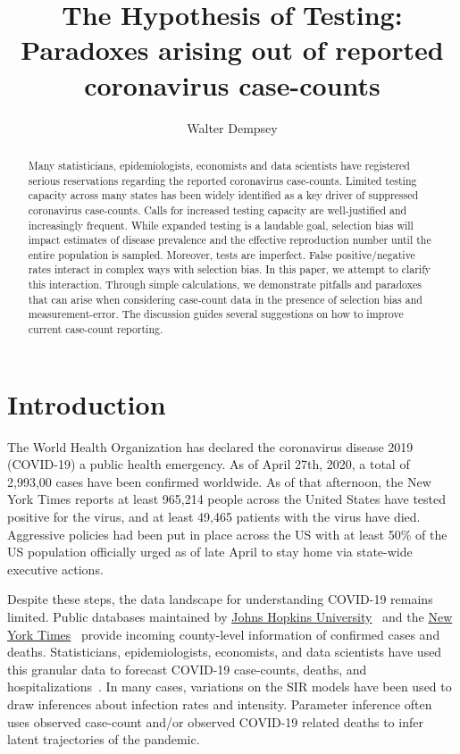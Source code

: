 \documentclass[aoas]{amsart}
\begin{document}
\title[The Hypothesis of Testing]{The Hypothesis of Testing: Paradoxes arising out of reported coronavirus case-counts} %

\author{Walter Dempsey}
\address{Department of Biostatistics, University of Michigan, Ann Arbor, MI 48109}

\begin{abstract}
Many statisticians, epidemiologists, economists and data scientists have registered serious reservations regarding the reported coronavirus case-counts. Limited testing capacity across many states has been widely identified as a key driver of suppressed coronavirus case-counts.  Calls for increased testing capacity are well-justified and increasingly frequent.  While expanded testing is a laudable goal, selection bias will impact estimates of disease prevalence and the effective reproduction number until the entire population is sampled.  Moreover, tests are imperfect.  False positive/negative rates interact in complex ways with selection bias.  In this paper, we attempt to clarify this interaction.  Through simple calculations, we demonstrate pitfalls and paradoxes that can arise when considering case-count data in the presence of selection bias and measurement-error. The discussion guides several suggestions on how to improve current case-count reporting.
\end{abstract}

\maketitle

\section{Introduction}
The World Health Organization has declared the coronavirus disease 2019 (COVID-19) a public health emergency.  As of April 27th, 2020, a total of 2,993,00 cases have been confirmed worldwide.  As of that afternoon, the New York Times reports at least 965,214 people across the United States have tested positive for the virus, and at least 49,465 patients with the virus have died.  Aggressive policies had been put in place across the US with at least 50\% of the US population officially urged as of late April to stay home via state-wide executive actions.

Despite these steps, the data landscape for understanding COVID-19 remains limited.  Public databases maintained by \href{https://bit.ly/2UqFSuA}{Johns Hopkins University}~\citep{JHU_Lancet} and the \href{https://bit.ly/2vUHfrK}{New York Times}~\cite{NYT} provide incoming county-level information of confirmed cases and deaths.  Statisticians, epidemiologists, economists, and data scientists have used this granular data to forecast COVID-19 case-counts, deaths, and hospitalizations~\citep{Song2020,Ray2020,2020.IHME}.  In many cases, variations on the SIR models have been used to draw inferences about infection rates and intensity.  Parameter inference often uses observed case-count and/or observed COVID-19 related deaths to infer latent trajectories of the pandemic.
\end{document}
